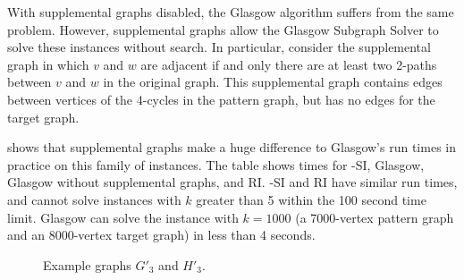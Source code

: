 With supplemental graphs disabled, the Glasgow algorithm suffers from the same problem.
However, supplemental graphs allow the Glasgow Subgraph Solver to solve these instances
without search.  In particular, consider the supplemental graph in which $v$ and $w$
are adjacent
if and only there are at least two 2-paths between $v$ and $w$ in the original graph.
This supplemental graph
contains edges between vertices of the 4-cycles in the pattern graph, but has no edges for the
target graph.

 shows that supplemental graphs make a huge
difference to Glasgow's run times in practice on this family of instances.  The
table shows times for \McSplit-SI, Glasgow, Glasgow without supplemental
graphs, and RI.  \McSplit-SI and RI have similar run times, and cannot solve
instances with $k$ greater than 5 within the 100 second time limit.  Glasgow can
solve the instance with $k=1000$ (a 7000-vertex pattern graph and an
8000-vertex target graph) in less than 4 seconds.

\begin{figure}[htb]
    \centering
    \caption{Example graphs $G'_3$ and $H'_3$.}\label{figure:glasgow-fast-example}
\end{figure}

